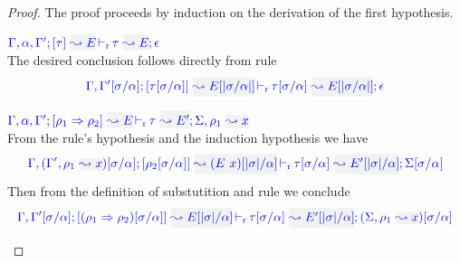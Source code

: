 \begin{proof}
The proof proceeds by induction on the derivation of the first hypothesis.
\begin{description}
\setlength{\itemsep}{1em}
\item[\fbox{\rref{M-Simp}}]\quad$\dmres{\tenv,\alpha,\tenv'}{\type}{E}{\type}{E}{\epsilon}$\\

The desired conclusion follows directly from rule 
\begin{equation*}
\dmres{\tenv,\tenv'[\suty/\alpha]}{\type[\suty/\alpha]}{E[|\suty/\alpha|]}{\type[\suty/\alpha]}{E[|\suty/\alpha|]}{\epsilon}
\end{equation*}

\item[\fbox{\rref{M-IApp}}]\quad$\dmres{\tenv,\alpha,\tenv'}{\rulet_1 \To \rulet_2}{E}{\type}{E'}{\Sigma,\ie{\rulet_1}{x}}$\\

From the rule's hypothesis and the induction hypothesis we have 
\begin{equation*}
\dmres{\tenv,(\tenv',\ie{\rulet_1}{x})[\suty/\alpha]}{\rulet_2[\suty/\alpha]}{(E~x)[|\suty|/\alpha]}{\type[\suty/\alpha]}{E'[|\suty|/\alpha]}{\Sigma[\suty/\alpha]}
\end{equation*}
  Then from the definition of substutition and rule  we conclude
\begin{equation*}
  \dmres{\tenv,\tenv'[\suty/\alpha]}{(\rulet_1 \To \rulet_2)[\suty/\alpha]}{E[|\suty|/\alpha]}{\type[\suty/\alpha]}{E'[|\suty|/\alpha]}{(\Sigma,\ie{\rulet_1}{x})[\suty/\alpha]}
\end{equation*}


\end{description}
\end{proof}
